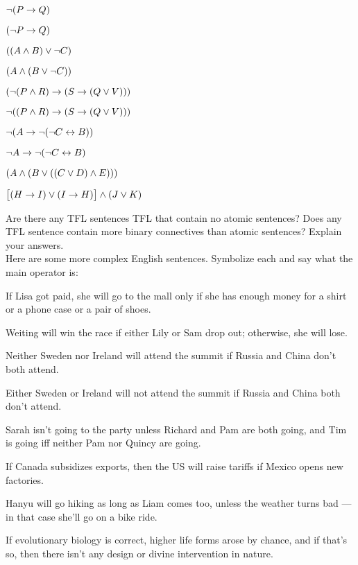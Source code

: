 \begin{earg}
\item $\neg (P \rightarrow Q)$
\item $(\neg P \rightarrow Q)$
\item $((A \wedge B) \vee \neg C)$
\item $(A \wedge (B \vee \neg C))$
\item $(\neg (P \wedge R) \rightarrow (S \rightarrow (Q \vee V)))$
\item$\neg ((P \wedge R) \rightarrow (S \rightarrow (Q \vee V)))$
\item $\neg(A \rightarrow \neg (\neg C \leftrightarrow B))$
\item $\neg A \rightarrow \neg (\neg C \leftrightarrow B)$
\item $(A \wedge (B \vee ((C \vee D) \wedge E)))$
\item $\bigl[(H \rightarrow I) \vee (I \rightarrow H)\bigr] \wedge (J \vee K)$
\end{earg}

\problempart
Are there any TFL sentences TFL that contain no atomic sentences? Does any TFL sentence contain more binary connectives than atomic sentences?  Explain your answers.\\

\problempart
Here are some more complex English sentences.   Symbolize each and say what the main operator is:


\begin{earg}

\item If Lisa got paid, she will go to the mall only if she has enough money for a shirt or a phone case or a pair of shoes.

\item Weiting will win the race if either Lily or Sam drop out; otherwise, she will lose.



\item Neither Sweden nor Ireland will attend the summit if Russia and China don't both attend.

\item Either Sweden or Ireland will not attend the summit if Russia and China both don't attend.

\item Sarah isn't going to the party unless Richard and Pam are both going, and Tim is
going iff neither Pam nor Quincy are going.

\item If Canada subsidizes exports, then the US will raise tariffs if Mexico opens new factories.


\item Hanyu will go hiking as long as Liam comes too, unless the weather turns bad --- in that case she'll go on a bike ride.

\item   If evolutionary biology is correct, higher life forms arose by  chance, and if that's so, then there isn't any design or divine intervention in nature.


\end{earg}